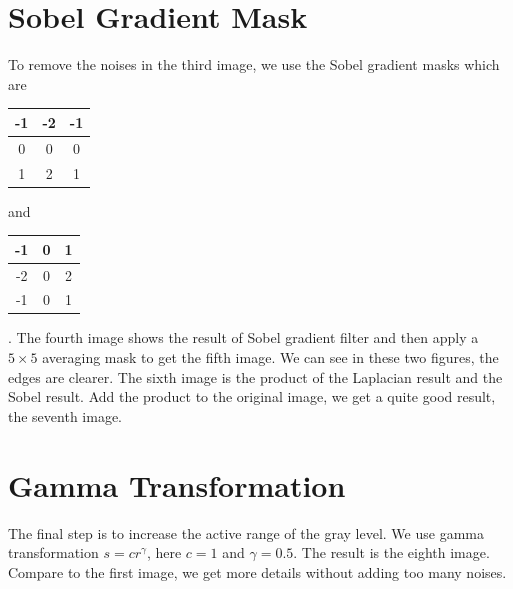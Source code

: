 \documentclass{article}
\begin{document}
\section{Sobel Gradient Mask}
To remove the noises in the third image, we use the Sobel gradient masks which are
\begin{tabular}{|c|c|c|}
	\hline -1&-2&-1\\
	\hline 0&0&0\\
	\hline 1&2&1\\
	\hline
\end{tabular} and 
\begin{tabular}{|c|c|c|}
	\hline -1&0&1\\
	\hline -2&0&2\\
	\hline -1&0&1\\
	\hline
\end{tabular}. 
The fourth image shows the result of Sobel gradient filter and then apply a $5\times5$ averaging mask to get the fifth image. We can see in these two figures, the edges are clearer. The sixth image is the product of the Laplacian result and the Sobel result. Add the product to the original image, we get a quite good result, the seventh image.

\section{Gamma Transformation}
The final step is to increase the active range of the gray level. We use gamma transformation $s=cr^\gamma$, here $c=1$ and $\gamma=0.5$. The result is the eighth image. Compare to the first image, we get more details without adding too many noises.
\end{document}
